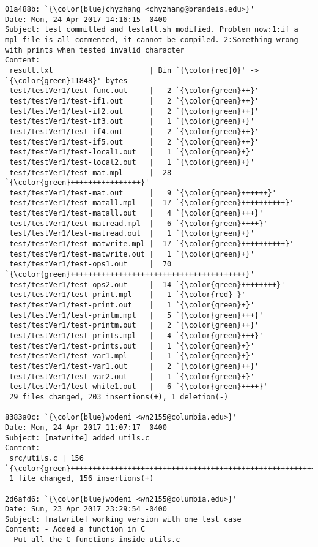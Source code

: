 \begin{lstlisting}
01a488b: `{\color{blue}chyzhang <chyzhang@brandeis.edu>}'
Date: Mon, 24 Apr 2017 14:16:15 -0400
Subject: test committed and testall.sh modified. Problem now:1:if a mpl file is all commented, it cannot be compiled. 2:Something wrong with prints when tested invalid character
Content: 
 result.txt                      | Bin `{\color{red}0}' -> `{\color{green}11848}' bytes
 test/testVer1/test-func.out     |   2 `{\color{green}++}'
 test/testVer1/test-if1.out      |   2 `{\color{green}++}'
 test/testVer1/test-if2.out      |   2 `{\color{green}++}'
 test/testVer1/test-if3.out      |   1 `{\color{green}+}'
 test/testVer1/test-if4.out      |   2 `{\color{green}++}'
 test/testVer1/test-if5.out      |   2 `{\color{green}++}'
 test/testVer1/test-local1.out   |   1 `{\color{green}+}'
 test/testVer1/test-local2.out   |   1 `{\color{green}+}'
 test/testVer1/test-mat.mpl      |  28 `{\color{green}++++++++++++++++}'
 test/testVer1/test-mat.out      |   9 `{\color{green}++++++}'
 test/testVer1/test-matall.mpl   |  17 `{\color{green}++++++++++}'
 test/testVer1/test-matall.out   |   4 `{\color{green}+++}'
 test/testVer1/test-matread.mpl  |   6 `{\color{green}++++}'
 test/testVer1/test-matread.out  |   1 `{\color{green}+}'
 test/testVer1/test-matwrite.mpl |  17 `{\color{green}++++++++++}'
 test/testVer1/test-matwrite.out |   1 `{\color{green}+}'
 test/testVer1/test-ops1.out     |  70 `{\color{green}++++++++++++++++++++++++++++++++++++++++}'
 test/testVer1/test-ops2.out     |  14 `{\color{green}++++++++}'
 test/testVer1/test-print.mpl    |   1 `{\color{red}-}'
 test/testVer1/test-print.out    |   1 `{\color{green}+}'
 test/testVer1/test-printm.mpl   |   5 `{\color{green}+++}'
 test/testVer1/test-printm.out   |   2 `{\color{green}++}'
 test/testVer1/test-prints.mpl   |   4 `{\color{green}+++}'
 test/testVer1/test-prints.out   |   1 `{\color{green}+}'
 test/testVer1/test-var1.mpl     |   1 `{\color{green}+}'
 test/testVer1/test-var1.out     |   2 `{\color{green}++}'
 test/testVer1/test-var2.out     |   1 `{\color{green}+}'
 test/testVer1/test-while1.out   |   6 `{\color{green}++++}'
 29 files changed, 203 insertions(+), 1 deletion(-)

8383a0c: `{\color{blue}wodeni <wn2155@columbia.edu>}'
Date: Mon, 24 Apr 2017 11:07:17 -0400
Subject: [matwrite] added utils.c
Content: 
 src/utils.c | 156 `{\color{green}++++++++++++++++++++++++++++++++++++++++++++++++++++++++++++}'
 1 file changed, 156 insertions(+)

2d6afd6: `{\color{blue}wodeni <wn2155@columbia.edu>}'
Date: Sun, 23 Apr 2017 23:29:54 -0400
Subject: [matwrite] working version with one test case
Content: - Added a function in C
- Put all the C functions inside utils.c


\end{lstlisting}
